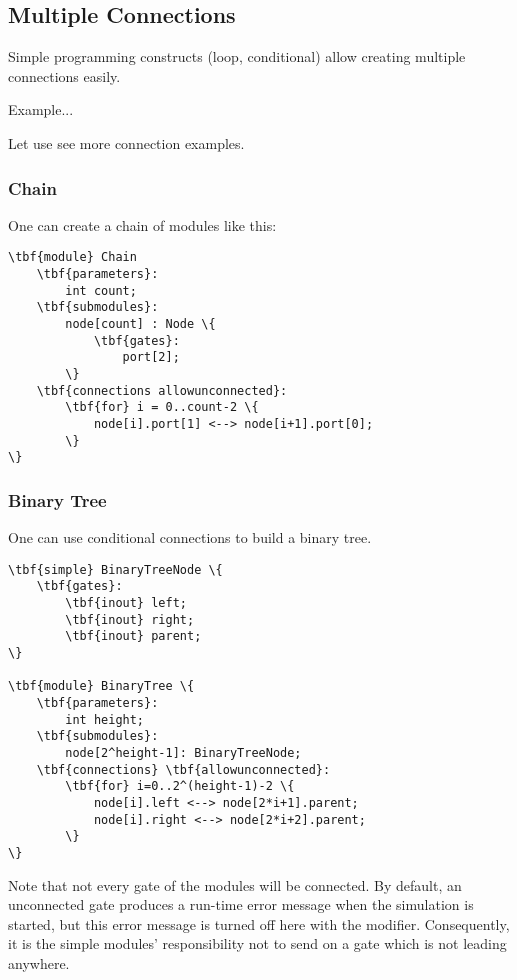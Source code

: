 \subsection{Multiple Connections}

Simple programming constructs (loop, conditional) allow creating
multiple connections easily.

Example...

Let use see more connection examples.

\subsubsection{Chain}

One can create a chain of modules like this:

\begin{Verbatim}[commandchars=\\\{\}]
\tbf{module} Chain
    \tbf{parameters}:
        int count;
    \tbf{submodules}:
        node[count] : Node \{
            \tbf{gates}:
                port[2];
        \}
    \tbf{connections allowunconnected}:
        \tbf{for} i = 0..count-2 \{
            node[i].port[1] <--> node[i+1].port[0];
        \}
\}
\end{Verbatim}


\subsubsection{Binary Tree}

One can use conditional connections to build a binary tree.

\begin{Verbatim}[commandchars=\\\{\}]
\tbf{simple} BinaryTreeNode \{
    \tbf{gates}:
        \tbf{inout} left;
        \tbf{inout} right;
        \tbf{inout} parent;
\}

\tbf{module} BinaryTree \{
    \tbf{parameters}:
        int height;
    \tbf{submodules}:
        node[2^height-1]: BinaryTreeNode;
    \tbf{connections} \tbf{allowunconnected}:
        \tbf{for} i=0..2^(height-1)-2 \{
            node[i].left <--> node[2*i+1].parent;
            node[i].right <--> node[2*i+2].parent;
        \}
\}
\end{Verbatim}

Note that not every gate of the modules will be connected. By default,
an unconnected gate produces a run-time error message when the
simulation is started, but this error message is turned off here with
the  modifier.
Consequently, it is the simple modules' responsibility not to send
on a gate which is not leading anywhere.



